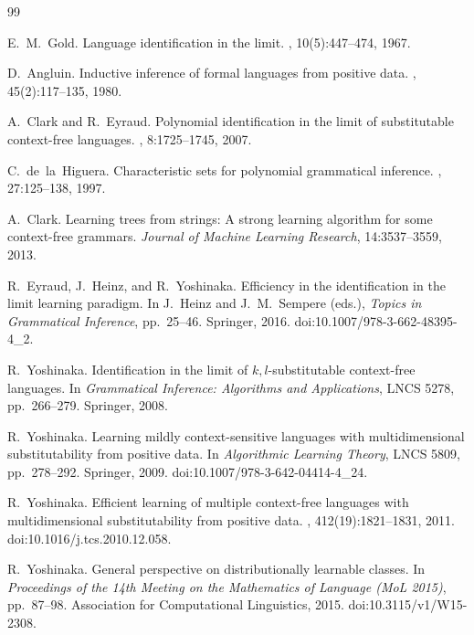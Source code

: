 \documentclass[11pt]{article}
\numberwithin{equation}{section}
\theoremstyle{plain}
\theoremstyle{definition}
\theoremstyle{remark}
\theoremstyle{plain}
\begin{document}
\begin{thebibliography}{99}

E.~M.~Gold.
\newblock Language identification in the limit.
, 10(5):447--474, 1967.

D.~Angluin.
\newblock Inductive inference of formal languages from positive data.
, 45(2):117--135, 1980.

A.~Clark and R.~Eyraud.
\newblock Polynomial identification in the limit of substitutable context-free
languages.
, 8:1725--1745, 2007.

C.~de~la~Higuera.
\newblock Characteristic sets for polynomial grammatical inference.
, 27:125--138, 1997.

A.~Clark.
\newblock Learning trees from strings: A strong learning algorithm for some context-free grammars.
\newblock \emph{Journal of Machine Learning Research}, 14:3537--3559, 2013.

R.~Eyraud, J.~Heinz, and R.~Yoshinaka.
\newblock Efficiency in the identification in the limit learning paradigm.
\newblock In J.~Heinz and J.~M.~Sempere (eds.), {\em Topics in Grammatical
Inference}, pp.~25--46. Springer, 2016.
\newblock doi:10.1007/978-3-662-48395-4\_2.

R.~Yoshinaka.
\newblock Identification in the limit of $k,l$-substitutable context-free
languages.
\newblock In {\em Grammatical Inference: Algorithms and Applications},
LNCS 5278, pp.~266--279. Springer, 2008.

R.~Yoshinaka.
\newblock Learning mildly context-sensitive languages with multidimensional
 substitutability from positive data.
\newblock In {\em Algorithmic Learning Theory}, LNCS 5809, pp.~278--292.
 Springer, 2009.
\newblock doi:10.1007/978-3-642-04414-4\_24.

R.~Yoshinaka.
\newblock Efficient learning of multiple context-free languages with
multidimensional substitutability from positive data.
, 412(19):1821--1831, 2011.
\newblock doi:10.1016/j.tcs.2010.12.058.

R.~Yoshinaka.
\newblock General perspective on distributionally learnable classes.
\newblock In \emph{Proceedings of the 14th Meeting on the Mathematics
of Language (MoL 2015)}, pp.~87--98.
Association for Computational Linguistics, 2015.
\newblock doi:10.3115/v1/W15-2308.


\end{thebibliography}
\end{document}
